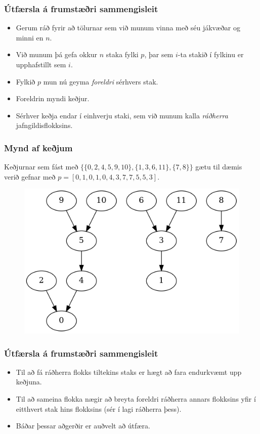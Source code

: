 \documentclass{beamer}
\begin{document}
\begin{frame}
\frametitle{Útfærsla á frumstæðri sammengisleit}
\begin{itemize}
	\item<1-> Gerum ráð fyrir að tölurnar sem við munum vinna með séu jákvæðar og minni en $n$.
	\item<2-> Við munum þá gefa okkur $n$ staka fylki $p$, þar sem $i$-ta stakið í fylkinu er upphafstillt sem $i$.
	\item<3-> Fylkið $p$ mun nú geyma \emph{foreldri} sérhvers stak.
	\item<3-> Foreldrin myndi keðjur.
	\item<4-> Sérhver keðja endar í einhverju staki, sem við munum kalla \emph{ráðherra} jafngildisflokksins.
\end{itemize}
\end{frame}

\begin{frame}
\frametitle{Mynd af keðjum}
	Keðjurnar sem fást með $\{\{0, 2, 4, 5, 9, 10\}, \{1, 3, 6, 11\}, \{7, 8\}\}$ gætu til dæmis verið
	gefnar með $p = [0, 1, 0, 1, 0, 4, 3, 7, 7, 5, 5, 3]$.
	\begin{figure}
	\item<2->
		\includegraphics[scale=0.5]{mynd.png}
	\end{figure}
\end{frame}

\begin{frame}
\frametitle{Útfærsla á frumstæðri sammengisleit}
\begin{itemize}
	\item<1-> Til að fá ráðherra flokks tiltekins staks er hægt að fara endurkvæmt upp keðjuna.
	\item<2-> Til að sameina flokka nægir að breyta foreldri ráðherra annars flokksins yfir í
		eitthvert stak hins flokksins (sér í lagi ráðherra þess).
	\item<3-> Báðar þessar aðgerðir er auðvelt að útfæra.
\end{itemize}
\end{frame}
\end{document}
